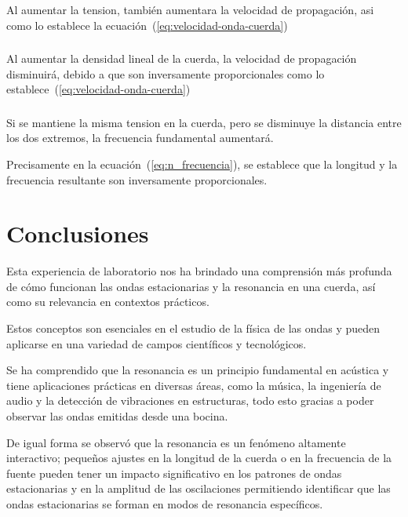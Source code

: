 \documentclass[twocolumn, 12pt]{article}
\begin{document}
\subsubsection{}

Al aumentar la tension, también aumentara la velocidad de
propagación, asi como lo establece la
ecuación~(\ref{eq:velocidad-onda-cuerda})

\subsubsection{}

Al aumentar la densidad lineal de la cuerda, la velocidad
de propagación disminuirá, debido a que son inversamente
proporcionales como lo
establece~(\ref{eq:velocidad-onda-cuerda})

\subsubsection{}

Si se mantiene la misma tension en la cuerda, pero se
disminuye la distancia entre los dos extremos, la
frecuencia fundamental aumentará.

Precisamente en la ecuación~(\ref{eq:n_frecuencia}), se
establece que la longitud y la frecuencia resultante son
inversamente proporcionales.

\section{Conclusiones}

Esta experiencia de laboratorio nos ha brindado una
comprensión más profunda de cómo funcionan las ondas
estacionarias y la resonancia en una cuerda, así como su
relevancia en contextos prácticos.

Estos conceptos son esenciales en el estudio de la física
de las ondas y pueden aplicarse en una variedad de campos
científicos y tecnológicos.

Se ha comprendido que la resonancia es un principio
fundamental en acústica y tiene aplicaciones prácticas en
diversas áreas, como la música, la ingeniería de audio y la
detección de vibraciones en estructuras, todo esto gracias
a poder observar las ondas emitidas desde una bocina.

De igual forma se observó que la resonancia es un fenómeno
altamente interactivo; pequeños ajustes en la longitud de
la cuerda o en la frecuencia de la fuente pueden tener un
impacto significativo en los patrones de ondas
estacionarias y en la amplitud de las oscilaciones
permitiendo identificar que las ondas estacionarias se
forman en modos de resonancia específicos. 

\printbibliography
\end{document}
